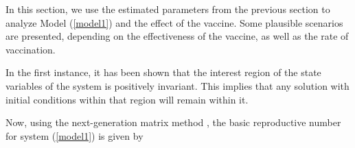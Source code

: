 In this section, we use the estimated parameters from the previous section to analyze Model (\ref{model1}) and the effect of the vaccine. Some plausible scenarios are presented, depending on the effectiveness of the vaccine,  as well as the rate of vaccination.

In the first instance, it has been shown that the interest region of the state variables of the system is positively invariant. This implies that any solution with initial conditions within that region will remain within it.




Now, using the next-generation matrix method  \cite{Diekmann1990, Van2002}, the basic reproductive number for system (\ref{model1}) is given by


